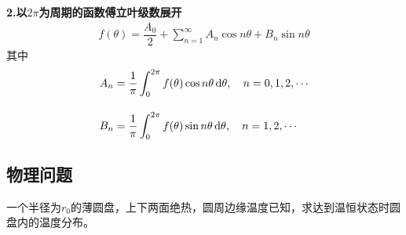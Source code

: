 \noindent \textbf{2.以$2 \pi$为周期的函数傅立叶级数展开}
\begin{align}
	f(\theta) = \dfrac{A_0}{2}+ \sum_{n = 1}^{\infty} A_n\cos n\theta +B_n \sin n\theta
\end{align}
其中
\begin{align*}
	A_n &= \dfrac{1}{\pi} \int_{0}^{2\pi}f(\theta)\cos n\theta \, {\rm{d}} \theta,\quad n = 0,1,2,\cdots\\[1em]
	B_n &= \dfrac{1}{\pi} \int_{0}^{2\pi}f(\theta)\sin n\theta \, {\rm{d}} \theta,\quad n = 1,2,\cdots
\end{align*}

\subsection{物理问题}
一个半径为$r_0$的薄圆盘，上下两面绝热，圆周边缘温度已知，求达到温恒状态时圆盘内的温度分布。
